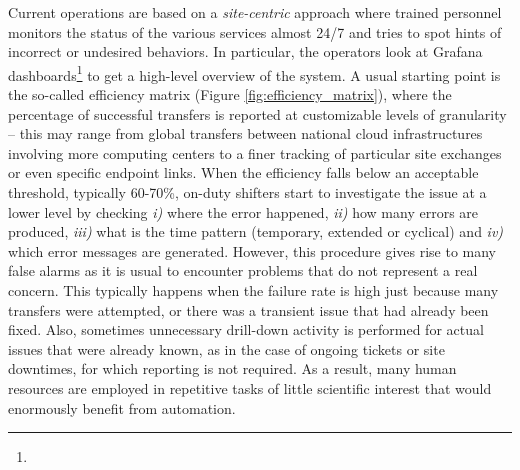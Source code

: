 Current operations are based on a \textit{site-centric} approach where trained personnel monitors the status of the various services almost 24/7 and tries to spot hints of incorrect or undesired behaviors. In particular, the operators look at Grafana dashboards\footnote{\grafana}
 to get a high-level overview of the system. A usual starting point is the so-called efficiency matrix (Figure \ref{fig:efficiency_matrix}), where the percentage of successful transfers is reported at customizable levels of granularity -- this may range from global transfers between national cloud infrastructures involving more computing centers to a finer tracking of particular site exchanges or even specific endpoint links. %
When the efficiency falls below an acceptable threshold, typically 60-70\%, on-duty shifters start to investigate the issue at a lower level by checking \emph{i)} where the error happened, \emph{ii)} how many errors are produced, \emph{iii)} what is the time pattern (temporary, extended or cyclical) and \emph{iv)} which error messages are generated. 
However, this procedure gives rise to many false alarms as it is usual to encounter problems that do not represent a real concern. This typically happens when the failure rate is high just because many transfers were attempted, or there was a transient issue that had already been fixed. 
Also, sometimes unnecessary drill-down activity is performed for actual issues that were already known, as in the case of ongoing tickets or site downtimes, for which reporting is not required.
As a result, many human resources are employed in repetitive tasks of little scientific interest that would enormously benefit from automation. 


